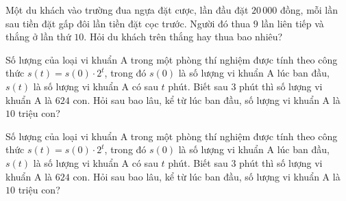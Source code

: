\begin{ex}%
	Một du khách vào trường đua ngựa đặt cược, lần đầu đặt $20\,000$ đồng, mỗi lần sau tiền đặt gấp đôi lần tiền đặt cọc  trước. Người đó thua $9$ lần liên tiếp và thắng ở lần thứ $10$. Hỏi du khách trên thắng hay thua bao nhiêu?
\end{ex}

\begin{bt}%
	Số lượng của loại vi khuẩn A trong một phòng thí nghiệm được tính theo công thức $s(t)=s(0)\cdot 2^t$, trong đó $s(0)$ là số lượng vi khuẩn A lúc ban đầu, $s(t)$ là  số lượng vi khuẩn A có sau $t$ phút. Biết sau $3$ phút thì số lượng vi khuẩn A là $624$ con. Hỏi sau bao lâu, kể từ lúc ban đầu, số lượng vi khuẩn A là $10$ triệu con?
\end{bt}

\begin{ex}%
	Số lượng của loại vi khuẩn A trong một phòng thí nghiệm được tính theo công  thức $s(t)=s(0)\cdot 2^t$, trong đó $s(0)$ là số lượng vi khuẩn A lúc ban đầu, $s(t)$ là số lượng vi khuẩn A có sau $t$ phút. Biết sau $3$ phút thì số lượng vi khuẩn A là $624$ con. Hỏi sau bao lâu, kể từ lúc ban đầu, số lượng vi khuẩn A là $10$ triệu con?
\end{ex}

